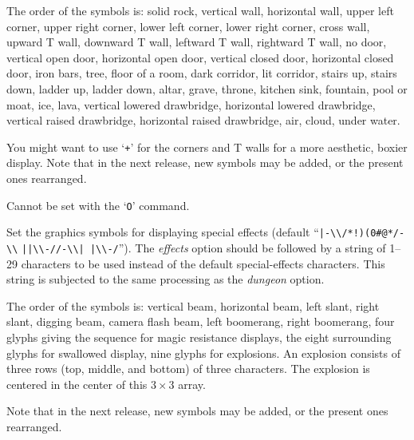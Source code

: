 The order of the symbols is:  solid rock, vertical wall, horizontal
wall, upper left corner, upper right corner, lower left corner, lower
right corner, cross wall, upward T wall, downward T wall, leftward T
wall, rightward T wall, no door, vertical open door, horizontal open
door, vertical closed door, horizontal closed door, iron bars, tree,
floor of a room, dark corridor, lit corridor, stairs up, stairs down,
ladder up, ladder down, altar, grave, throne, kitchen sink, fountain, pool or moat,
ice, lava, vertical lowered drawbridge, horizontal lowered drawbridge,
vertical raised drawbridge, horizontal raised drawbridge, air, cloud,
under water.

You might want to use `{\tt +}' for the corners and T walls for a more
aesthetic, boxier display.  Note that in the next release, new symbols
may be added, or the present ones rearranged.

Cannot be set with the `{\tt O}' command.
\item[\ib{effects}]
Set the graphics symbols for displaying special effects (default
``\verb&|-\\/*!)(0#@*/-\\& \verb&||\\-//-\\| |\\-/&'').
The {\it effects\/} option should be
followed by a string of 1--29
characters to be used instead of the default special-effects characters.
This string is subjected to the same processing as the {\it dungeon\/} option.

The order of the symbols is:  vertical beam, horizontal beam, left slant,
right slant, digging beam, camera flash beam, left boomerang, right boomerang,
four glyphs giving the sequence for magic resistance displays,
the eight surrounding glyphs for swallowed display,
nine glyphs for explosions.
An explosion consists of three rows (top, middle, and bottom) of three
characters.  The explosion is centered in the center of this $3 \times 3$
array.

Note that in the next release, new symbols may be added,
or the present ones rearranged.

